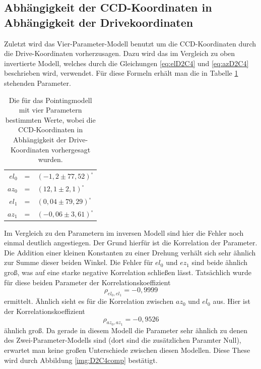 \subsection{Abhängigkeit der CCD-Koordinaten in Abhängigkeit der Drivekoordinaten}
Zuletzt wird das Vier-Parameter-Modell benutzt um die CCD-Koordinaten durch die Drive-Koordinaten vorherzusagen. Dazu wird das im Vergleich zu oben invertierte Modell, welches durch die Gleichungen \ref{eq:elD2C4} und \ref{eq:azD2C4} beschrieben wird, verwendet. Für diese Formeln erhält man die in Tabelle \ref{tab:D2C4} stehenden Parameter.
\begin{table}[htbp]
\centering
\begin{tabular}{rcl}
\toprule
$el_0$ &=& $(-1,2\pm 77,52)^{\circ}$\\
$az_0$ &=& $(12,1\pm 2,1)^{\circ}$\\
$el_1$ &=& $(0,04\pm 79,29)^{\circ}$\\
$az_1$ &=& $(-0,06\pm 3,61)^{\circ}$\\
\bottomrule
\end{tabular}
\caption{Die für das Pointingmodell mit vier Parametern bestimmten Werte, wobei die CCD-Koordinaten in Abhängigkeit der Drive-Koordinaten vorhergesagt wurden.}
\label{tab:D2C4}
\end{table}
Im Vergleich zu den Parametern im inversen Modell sind hier die Fehler noch einmal deutlich angestiegen. Der Grund hierfür ist die Korrelation der Parameter. Die Addition einer kleinen Konstanten zu einer Drehung verhält sich sehr ähnlich zur Summe dieser beiden Winkel. Die Fehler für $el_0$ und $ez_1$ sind beide ähnlich groß, was auf eine starke negative Korrelation schließen lässt. Tatsächlich wurde für diese beiden Parameter der Korrelationskoeffizient 
\begin{equation}
\rho_{el_0,el_1}= -0,9999
\end{equation}
ermittelt. Ähnlich sieht es für die Korrelation zwischen $az_0$ und $el_0$ aus. Hier ist der Korrelationskoeffizient
\begin{equation}
\rho_{az_0,az_1}= -0,9526
\end{equation}
ähnlich groß. Da gerade in diesem Modell die Parameter sehr ähnlich zu denen des Zwei-Parameter-Modells sind (dort sind die zusätzlichen Paramter Null), erwartet man keine großen Unterschiede zwischen diesen Modellen. Diese These wird durch Abbildung \ref{img:D2C4comp} bestätigt.
